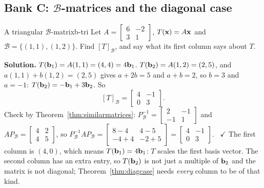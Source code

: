 \documentclass[11pt]{article}
\begin{document}
\subsection*{Bank C: $\mathcal{B}$-matrices and the diagonal case}
\begin{exmp}{A triangular $\mathcal{B}$-matrix}{b-tri}
Let $A=\begin{bmatrix}6&-2\\3&1\end{bmatrix}$, $T(\mathbf{x})=A\mathbf{x}$ and $\mathcal{B}=\{(1,1),(1,2)\}$. Find $[T]_{\mathcal{B}}$, and say what its first column says about $T$.

\textbf{Solution.} $T(\mathbf{b}_1)=A(1,1)=(4,4)=4\mathbf{b}_1$. $T(\mathbf{b}_2)=A(1,2)=(2,5)$, and $a(1,1)+b(1,2)=(2,5)$ gives $a+2b=5$ and $a+b=2$, so $b=3$ and $a=-1$: $T(\mathbf{b}_2)=-\mathbf{b}_1+3\mathbf{b}_2$. So
\[
[T]_{\mathcal{B}}=\begin{bmatrix}4&-1\\0&3\end{bmatrix}.
\]
Check by Theorem~\ref{thm:similarmatrices}: $P_{\mathcal{B}}^{-1}=\begin{bmatrix}2&-1\\-1&1\end{bmatrix}$ and $AP_{\mathcal{B}}=\begin{bmatrix}4&2\\4&5\end{bmatrix}$, so $P_{\mathcal{B}}^{-1}AP_{\mathcal{B}}=\begin{bmatrix}8-4&4-5\\-4+4&-2+5\end{bmatrix}=\begin{bmatrix}4&-1\\0&3\end{bmatrix}$. \ $\checkmark$ The first column is $(4,0)$, which means $T(\mathbf{b}_1)=4\mathbf{b}_1$: $T$ scales the first basis vector. The second column has an extra entry, so $T(\mathbf{b}_2)$ is not just a multiple of $\mathbf{b}_2$ and the matrix is not diagonal; Theorem~\ref{thm:diagcase} needs \emph{every} column to be of that kind.
\end{exmp}
\end{document}
